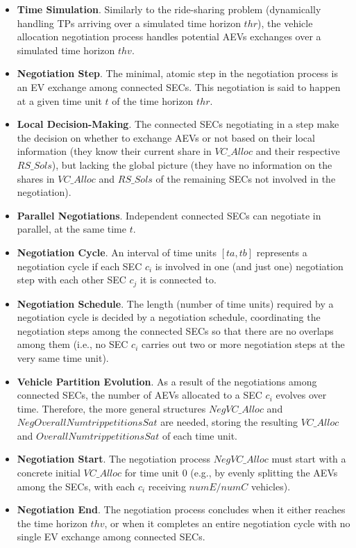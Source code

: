 \begin{itemize}
\item \textbf{Time Simulation}. Similarly to the ride-sharing problem (dynamically handling TPs arriving over a
simulated time horizon $thr$), the vehicle allocation negotiation process handles potential AEVs exchanges over
a simulated time horizon $thv$.
\item \textbf{Negotiation Step}. The minimal, atomic step in the negotiation process is an EV exchange among
connected SECs.%
This negotiation is said to happen at a given time unit $t$ of the time horizon $thr$.
\item \textbf{Local Decision-Making}.
The connected SECs negotiating in a step make the decision on whether to exchange AEVs or not based on their local information
(they know their current share in $VC\_Alloc$ and their respective $RS\_Sols$),
but lacking the global picture (they have no information on the shares in $VC\_Alloc$ and $RS\_Sols$ of the remaining
SECs not involved in the negotiation).
\item \textbf{Parallel Negotiations}.
Independent connected SECs can negotiate in parallel, at the same time $t$.
\item \textbf{Negotiation Cycle}.
An interval of time units $[ta, tb]$ represents a negotiation cycle if each SEC $c_i$ is involved in one
(and just one) negotiation step with each other SEC $c_j$ it is connected to.
\item \textbf{Negotiation Schedule}.
The length (number of time units) required by a negotiation cycle is decided by a negotiation schedule,
coordinating the negotiation steps among the connected SECs so that there are no overlaps among them (i.e.,
no SEC $c_i$ carries out two or more negotiation steps at the very same time unit).
\item \textbf{Vehicle Partition Evolution}.
As a result of the negotiations among connected SECs, the number of AEVs allocated to a SEC $c_i$
evolves over time. Therefore, the more general structures $NegVC\_Alloc$ and \\$NegOverallNumtrip petitionsSat$ are needed,
storing the resulting $VC\_Alloc$ and $OverallNumtrip petitionsSat$ of each time unit.
\item \textbf{Negotiation Start}.
The negotiation process $NegVC\_Alloc$ must start with a concrete initial $VC\_Alloc$ for time unit 0 (e.g., by evenly
splitting the AEVs among the SECs, with each $c_i$ receiving $numE / numC$ vehicles).
\item \textbf{Negotiation End}.
The negotiation process concludes when it either reaches the time horizon $thv$, or when it completes an entire
negotiation cycle with no single EV exchange among connected SECs.
\end{itemize}

